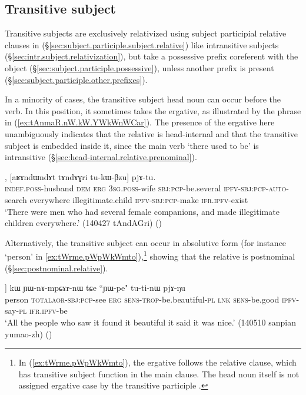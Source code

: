 \subsection{Transitive subject}  \label{sec:tr.subject.relativization}
Transitive subjects are exclusively relativized using subject participial relative clauses in  (§\ref{sec:subject.participle.subject.relative}) like intransitive subjects (§\ref{sec:intr.subject.relativization}), but take a possessive prefix coreferent with the object (§\ref{sec:subject.participle.possessive}), unless another prefix is present (§\ref{sec:subject.participle.other.prefixes}).

In a minority of cases, the transitive subject head noun can occur before the verb. In this position, it sometimes takes the ergative, as illustrated by the phrase  in (\ref{ex:tAnmaR.nW.kW.YWkWnWCar}). The presence of the ergative here unambiguously indicates that the relative is head-internal and that the transitive subject is embedded inside it, since the main verb  `there used to be' is intransitive (§\ref{sec:head-internal.relative.prenominal}).
 
\begin{exe}
\ex \label{ex:tAnmaR.nW.kW.YWkWnWCar}
, [aʁɤndɯndɤt tɤndɤɣri tu-kɯ-βzu] pjɤ-tu. \\
\textsc{indef}.\textsc{poss}-husband \textsc{dem} \textsc{erg} \textsc{3sg}.\textsc{poss}-wife \textsc{sbj}:\textsc{pcp}-be.several \textsc{ipfv}-\textsc{sbj}:\textsc{pcp}-\textsc{auto}-search everywhere illegitimate.child \textsc{ipfv}-\textsc{sbj}:\textsc{pcp}-make \textsc{ifr}.\textsc{ipfv}-exist \\
\glt `There were men who had several female companions, and made illegitimate children everywhere.' (140427 tAndAGri)
()
\end{exe} 

Alternatively, the transitive subject can occur in absolutive form (for instance  `person' in \ref{ex:tWrme.pWpWkWmto}),\footnote{In (\ref{ex:tWrme.pWpWkWmto}), the ergative  follows the relative clause, which has transitive subject function in the main clause. The head noun  itself is not assigned ergative case by the transitive participle . } showing that the relative is postnominal (§\ref{sec:postnominal.relative}).

\begin{exe}
\ex \label{ex:tWrme.pWpWkWmto}
\gll [\textbf{tɯrme} [pɯ\redp{}pɯ-kɯ-mto]] kɯ ɲɯ-nɤ-mpɕɤr-nɯ tɕe ``ɲɯ-pe" tu-ti-nɯ pjɤ-ŋu \\
person \textsc{total}\redp{}\textsc{aor}-\textsc{sbj}:\textsc{pcp}-see \textsc{erg} \textsc{sens}-\textsc{trop}-be.beautiful-\textsc{pl} \textsc{lnk} \textsc{sens}-be.good \textsc{ipfv}-say-\textsc{pl} \textsc{ifr}.\textsc{ipfv}-be \\
\glt `All the people who saw it found it beautiful it said it was nice.' (140510 sanpian yumao-zh)
()
\end{exe}

